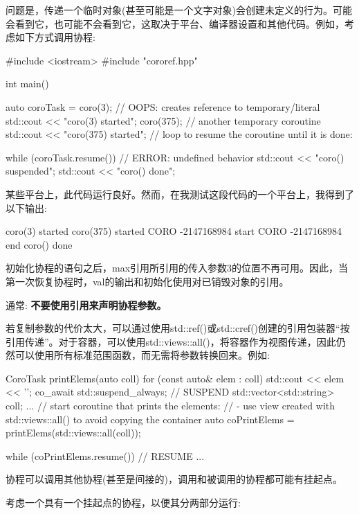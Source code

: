 问题是，传递一个临时对象(甚至可能是一个文字对象)会创建未定义的行为。可能会看到它，也可能不会看到它，这取决于平台、编译器设置和其他代码。例如，考虑如下方式调用协程:


\begin{cpp}
#include <iostream>
#include "cororef.hpp"

int main()
{
	auto coroTask = coro(3); // OOPS: creates reference to temporary/literal
	std::cout << "coro(3) started\n";
	coro(375); // another temporary coroutine
	std::cout << "coro(375) started\n";
	// loop to resume the coroutine until it is done:
	
	while (coroTask.resume()) { // ERROR: undefined behavior
		std::cout << "coro() suspended\n";
	}
	std::cout << "coro() done\n";
}
\end{cpp}

某些平台上，此代码运行良好。然而，在我测试这段代码的一个平台上，我得到了以下输出:

\begin{shell}
coro(3) started
coro(375) started
  CORO -2147168984 start
  CORO -2147168984 end
coro() done
\end{shell}

初始化协程的语句之后，max引用所引用的传入参数3的位置不再可用。因此，当第一次恢复协程时，val的输出和初始化使用对已销毁对象的引用。

通常: \textbf{不要使用引用来声明协程参数。}

若复制参数的代价太大，可以通过使用std::ref()或std::cref()创建的引用包装器“按引用传递”。对于容器，可以使用std::views::all()，将容器作为视图传递，因此仍然可以使用所有标准范围函数，而无需将参数转换回来。例如:

\begin{cpp}
CoroTask printElems(auto coll)
{
	for (const auto& elem : coll) {
		std::cout << elem << '\n';
		co_await std::suspend_always{}; // SUSPEND
	}
}
std::vector<std::string> coll;
...
// start coroutine that prints the elements:
// - use view created with std::views::all() to avoid copying the container
auto coPrintElems = printElems(std::views::all(coll));

while (coPrintElems.resume()) { // RESUME
...
}
\end{cpp}


协程可以调用其他协程(甚至是间接的)，调用和被调用的协程都可能有挂起点。

考虑一个具有一个挂起点的协程，以便其分两部分运行:

